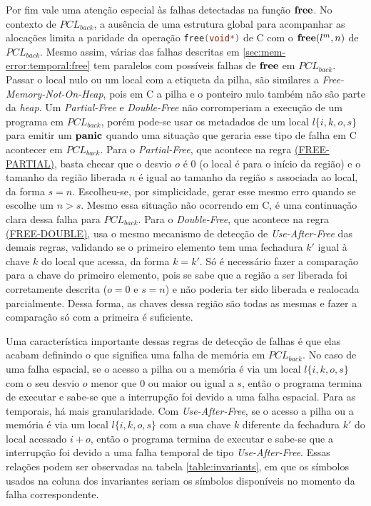 Por fim vale uma atenção especial às falhas detectadas na função $\mathbf{free}$. No contexto de $PCL_{back}$, a ausência de uma estrutura global para acompanhar as alocações limita a paridade da operação \lstinline[language=C]|free(void*)| de C com o $\mathbf{free}(l^m, n)$ de $PCL_{back}$. Mesmo assim, várias das falhas descritas em \ref{sec:mem-error:temporal:free} tem paralelos com possíveis falhas de $\mathbf{free}$ em $PCL_{back}$. Passar o local nulo ou um local com a etiqueta da pilha, são similares a \emph{Free-Memory-Not-On-Heap}, pois em C a pilha e o ponteiro nulo também não são parte da \emph{heap}. Um \emph{Partial-Free} e \emph{Double-Free} não corromperiam a execução de um programa em $PCL_{back}$, porém pode-se usar os metadados de um local $l\{i, k, o, s\}$ para emitir um $\mathbf{panic}$ quando uma situação que geraria esse tipo de falha em C acontecer em $PCL_{back}$. Para o \emph{Partial-Free}, que acontece na regra \hyperref[rule:free-partial]{(FREE-PARTIAL)}, basta checar que o desvio $o$ é 0 (o local é para o início da região) e o tamanho da região liberada $n$ é igual ao tamanho da região $s$ associada ao local, da forma $s = n$. Escolheu-se, por simplicidade, gerar esse mesmo erro quando se escolhe um $n > s$. Mesmo essa situação não ocorrendo em C, é uma continuação clara dessa falha para $PCL_{back}$. Para o \emph{Double-Free}, que acontece na regra \hyperref[rule:free-double]{(FREE-DOUBLE)}, usa o mesmo mecanismo de detecção de \emph{Use-After-Free} das demais regras, validando se o primeiro elemento tem uma fechadura $k'$ igual à chave $k$ do local que acessa, da forma $k = k'$. Só é necessário fazer a comparação para a chave do primeiro elemento, pois se sabe que a região a ser liberada foi corretamente descrita ($o = 0$ e $s = n$) e não poderia ter sido liberada e realocada parcialmente. Dessa forma, as chaves dessa região são todas as mesmas e fazer a comparação só com a primeira é suficiente.

Uma característica importante dessas regras de detecção de falhas é que elas acabam definindo o que significa uma falha de memória em $PCL_{back}$. No caso de uma falha espacial, se o acesso a pilha ou a memória é via um local $l\{i, k, o, s\}$ com o seu desvio $o$ menor que 0 ou maior ou igual a $s$, então o programa termina de executar e sabe-se que a interrupção foi devido a uma falha espacial. Para as temporais, há mais granularidade. Com \emph{Use-After-Free}, se o acesso a pilha ou a memória é via um local $l\{i, k, o, s\}$ com a sua chave $k$ diferente da fechadura $k'$ do local acessado $i + o$, então o programa termina de executar e sabe-se que a interrupção foi devido a uma falha temporal de tipo \emph{Use-After-Free}. Essas relações podem ser observadas na tabela \ref{table:invariants}, em que os símbolos usados na coluna dos invariantes seriam os símbolos disponíveis no momento da falha correspondente.


